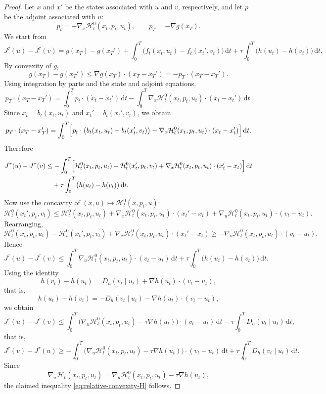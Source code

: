 \documentclass[11pt]{amsart}
\theoremstyle{plain}
\theoremstyle{definition}
\theoremstyle{remark}
\newcommand{\dd}{\,\mathrm{d}}
\begin{document}
\begin{proof}
Let $x$ and $x'$ be the states associated with $u$ and $v$, respectively, and let $p$ be the adjoint associated with $u$:
\[
\dot p_t=-\nabla_x \mathcal H_t^0(x_t,p_t,u_t),\qquad p_T= -\nabla g(x_T).
\]
We start from
\[
J^\tau(u)-J^\tau(v)
=
g(x_T)-g(x_T')
+\int_0^T \bigl(f_t(x_t,u_t)-f_t(x_t',v_t)\bigr)\dd t
+\tau \int_0^T \bigl(h(u_t)-h(v_t)\bigr)\dd t.
\]
By convexity of $g$,
\[
g(x_T)-g(x_T')\le \nabla g(x_T)\cdot(x_T-x_T')= -p_T\cdot(x_T-x_T').
\]
Using integration by parts and the state and adjoint equations,
\[
p_T\cdot(x_T-x_T')
=
\int_0^T p_t\cdot(\dot x_t-\dot x_t')\dd t
-
\int_0^T \nabla_x \mathcal H_t^0(x_t,p_t,u_t)\cdot(x_t-x_t')\dd t.
\]
Since $\dot x_t=b_t(x_t,u_t)$ and $\dot x_t'=b_t(x_t',v_t)$, we obtain
\[
p_T\cdot(x_T-x_T')
=
\int_0^T \Bigl[
p_t\cdot\bigl(b_t(x_t,u_t)-b_t(x_t',v_t)\bigr)
-
\nabla_x \mathcal H_t^0(x_t,p_t,u_t)\cdot(x_t-x_t')
\Bigr]\dd t.
\]
Therefore
\begin{align*}
J^\tau(u)-J^\tau(v)
&\le
- \int_0^T
\Bigl[
\mathcal H_t^0(x_t,p_t,u_t)-\mathcal H_t^0(x_t',p_t,v_t)
+
\nabla_x \mathcal H_t^0(x_t,p_t,u_t)\cdot(x_t'-x_t)
\Bigr]\dd t \\
&\quad
+\tau \int_0^T \bigl(h(u_t)-h(v_t)\bigr)\dd t.
\end{align*}
Now use the concavity of $(x,u)\mapsto \mathcal H_t^0(x,p_t,u)$:
\[
\mathcal H_t^0(x_t',p_t,v_t)
\le
\mathcal H_t^0(x_t,p_t,u_t)
+\nabla_x \mathcal H_t^0(x_t,p_t,u_t)\cdot(x_t'-x_t)
+\nabla_u \mathcal H_t^0(x_t,p_t,u_t)\cdot(v_t-u_t).
\]
Rearranging,
\[
\mathcal H_t^0(x_t,p_t,u_t)-\mathcal H_t^0(x_t',p_t,v_t)
+\nabla_x \mathcal H_t^0(x_t,p_t,u_t)\cdot(x_t'-x_t)
\ge
-\nabla_u \mathcal H_t^0(x_t,p_t,u_t)\cdot(v_t-u_t).
\]
Hence
\[
J^\tau(u)-J^\tau(v)
\le
\int_0^T \nabla_u \mathcal H_t^0(x_t,p_t,u_t)\cdot(v_t-u_t)\dd t
+\tau \int_0^T \bigl(h(u_t)-h(v_t)\bigr)\dd t.
\]
Using the identity
\[
h(v_t)-h(u_t)
=
D_h(v_t\mid u_t)+\nabla h(u_t)\cdot (v_t-u_t),
\]
that is,
\[
h(u_t)-h(v_t)
=
- D_h(v_t\mid u_t) - \nabla h(u_t)\cdot (v_t-u_t),
\]
we obtain
\[
J^\tau(u)-J^\tau(v)
\le
\int_0^T
\bigl(\nabla_u \mathcal H_t^0(x_t,p_t,u_t) - \tau \nabla h(u_t)\bigr)\cdot(v_t-u_t)\dd t
-
\tau \int_0^T D_h(v_t\mid u_t)\dd t,
\]
that is,
\[
J^\tau(v)-J^\tau(u)
\ge
-\int_0^T
\bigl(\nabla_u \mathcal H_t^0(x_t,p_t,u_t) - \tau \nabla h(u_t)\bigr)\cdot(v_t-u_t)\dd t
+
\tau \int_0^T D_h(v_t\mid u_t)\dd t.
\]
Since
\[
\nabla_u \mathcal H_t^\tau(x_t,p_t,u_t)
=
\nabla_u \mathcal H_t^0(x_t,p_t,u_t) - \tau \nabla h(u_t),
\]
the claimed inequality \eqref{eq:relative-convexity-H} follows.
\end{proof}
\end{document}
